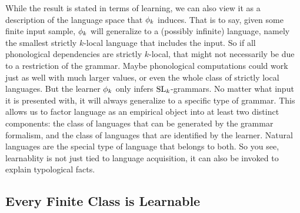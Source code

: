 While the result is stated in terms of learning, we can also view it as a description of the language space that $\phi_k$ induces.
That is to say, given some finite input sample, $\phi_k$ will generalize to a (possibly infinite) language, namely the smallest strictly $k$-local language that includes the input.
So if all phonological dependencies are strictly $k$-local, that might not necessarily be due to a restriction of the grammar.
Maybe phonological computations could work just as well with much larger values, or even the whole class of strictly local languages.
But the learner $\phi_k$ only infers $\mathrm{SL}_k$-grammars.
No matter what input it is presented with, it will always generalize to a specific type of grammar.
This allows us to factor language as an empirical object into at least two distinct components: the class of languages that can be generated by the grammar formalism, and the class of languages that are identified by the learner.
Natural languages are the special type of language that belongs to both.
So you see, learnablity is not just tied to language acquisition, it can also be invoked to explain typological facts.

\subsection{Every Finite Class is Learnable}
\label{sub:LearnSL_FiniteClass}

